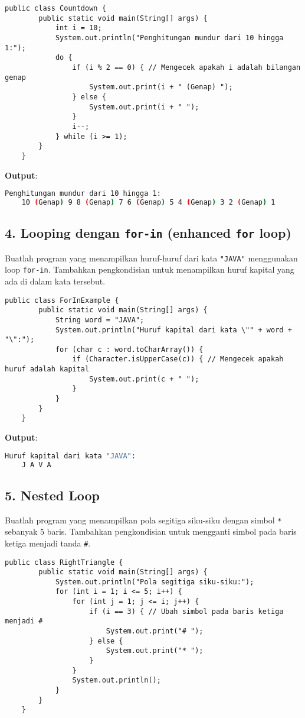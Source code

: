 \begin{lstlisting}[style=JavaStyle]
	public class Countdown {
		public static void main(String[] args) {
			int i = 10;
			System.out.println("Penghitungan mundur dari 10 hingga 1:");
			do {
				if (i % 2 == 0) { // Mengecek apakah i adalah bilangan genap
					System.out.print(i + " (Genap) ");
				} else {
					System.out.print(i + " ");
				}
				i--;
			} while (i >= 1);
		}
	}
\end{lstlisting}

\textbf{Output}:
\begin{lstlisting}[language=bash]
	Penghitungan mundur dari 10 hingga 1:
	10 (Genap) 9 8 (Genap) 7 6 (Genap) 5 4 (Genap) 3 2 (Genap) 1
\end{lstlisting}

\subsection{4. Looping dengan \texttt{for-in} (enhanced \texttt{for} loop)}
Buatlah program yang menampilkan huruf-huruf dari kata \texttt{"JAVA"} menggunakan loop \texttt{for-in}. Tambahkan pengkondisian untuk menampilkan huruf kapital yang ada di dalam kata tersebut.

\begin{lstlisting}[style=JavaStyle]
	public class ForInExample {
		public static void main(String[] args) {
			String word = "JAVA";
			System.out.println("Huruf kapital dari kata \"" + word + "\":");
			for (char c : word.toCharArray()) {
				if (Character.isUpperCase(c)) { // Mengecek apakah huruf adalah kapital
					System.out.print(c + " ");
				}
			}
		}
	}
\end{lstlisting}

\textbf{Output}:
\begin{lstlisting}[language=bash]
	Huruf kapital dari kata "JAVA":
	J A V A
\end{lstlisting}

\subsection{5. Nested Loop}
Buatlah program yang menampilkan pola segitiga siku-siku dengan simbol \texttt{*} sebanyak 5 baris. Tambahkan pengkondisian untuk mengganti simbol pada baris ketiga menjadi tanda \texttt{\#}.

\begin{lstlisting}[style=JavaStyle]
	public class RightTriangle {
		public static void main(String[] args) {
			System.out.println("Pola segitiga siku-siku:");
			for (int i = 1; i <= 5; i++) {
				for (int j = 1; j <= i; j++) {
					if (i == 3) { // Ubah simbol pada baris ketiga menjadi #
						System.out.print("# ");
					} else {
						System.out.print("* ");
					}
				}
				System.out.println();
			}
		}
	}
\end{lstlisting}

